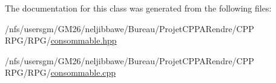 The documentation for this class was generated from the following files\-:\begin{DoxyCompactItemize}
\item 
/nfs/usersgm/\-G\-M26/neljibbawe/\-Bureau/\-Projet\-C\-P\-P\-A\-Rendre/\-C\-P\-P R\-P\-G/\-R\-P\-G/\hyperlink{consommable_8hpp}{consommable.\-hpp}\item 
/nfs/usersgm/\-G\-M26/neljibbawe/\-Bureau/\-Projet\-C\-P\-P\-A\-Rendre/\-C\-P\-P R\-P\-G/\-R\-P\-G/\hyperlink{consommable_8cpp}{consommable.\-cpp}\end{DoxyCompactItemize}
